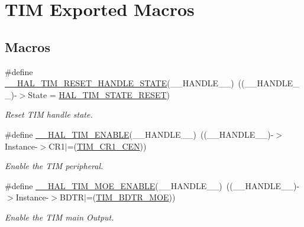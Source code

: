 \hypertarget{group___t_i_m___exported___macros}{}\section{T\+IM Exported Macros}
\label{group___t_i_m___exported___macros}
\subsection*{Macros}
\begin{DoxyCompactItemize}
\item 
\#define \hyperlink{group___t_i_m___exported___macros_gace20fd4e38231b9682fbc83a80ec19a3}{\+\_\+\+\_\+\+H\+A\+L\+\_\+\+T\+I\+M\+\_\+\+R\+E\+S\+E\+T\+\_\+\+H\+A\+N\+D\+L\+E\+\_\+\+S\+T\+A\+TE}(\+\_\+\+\_\+\+H\+A\+N\+D\+L\+E\+\_\+\+\_\+)~((\+\_\+\+\_\+\+H\+A\+N\+D\+L\+E\+\_\+\+\_\+)-\/$>$State = \hyperlink{group___t_i_m___exported___types_ggae0994cf5970e56ca4903e9151f40010ca28011b79e60b74a6c55947c505c51cbc}{H\+A\+L\+\_\+\+T\+I\+M\+\_\+\+S\+T\+A\+T\+E\+\_\+\+R\+E\+S\+ET})
\begin{DoxyCompactList}\small\item\em Reset T\+IM handle state. \end{DoxyCompactList}\item 
\#define \hyperlink{group___t_i_m___exported___macros_ga1a90544705059e9f19f991651623b0c0}{\+\_\+\+\_\+\+H\+A\+L\+\_\+\+T\+I\+M\+\_\+\+E\+N\+A\+B\+LE}(\+\_\+\+\_\+\+H\+A\+N\+D\+L\+E\+\_\+\+\_\+)~((\+\_\+\+\_\+\+H\+A\+N\+D\+L\+E\+\_\+\+\_\+)-\/$>$Instance-\/$>$C\+R1$\vert$=(\hyperlink{group___peripheral___registers___bits___definition_ga93d86355e5e3b399ed45e1ca83abed2a}{T\+I\+M\+\_\+\+C\+R1\+\_\+\+C\+EN}))
\begin{DoxyCompactList}\small\item\em Enable the T\+IM peripheral. \end{DoxyCompactList}\item 
\#define \hyperlink{group___t_i_m___exported___macros_ga04890dcef3ed061854721a3672585607}{\+\_\+\+\_\+\+H\+A\+L\+\_\+\+T\+I\+M\+\_\+\+M\+O\+E\+\_\+\+E\+N\+A\+B\+LE}(\+\_\+\+\_\+\+H\+A\+N\+D\+L\+E\+\_\+\+\_\+)~((\+\_\+\+\_\+\+H\+A\+N\+D\+L\+E\+\_\+\+\_\+)-\/$>$Instance-\/$>$B\+D\+TR$\vert$=(\hyperlink{group___peripheral___registers___bits___definition_ga277a096614829feba2d0a4fbb7d3dffc}{T\+I\+M\+\_\+\+B\+D\+T\+R\+\_\+\+M\+OE}))
\begin{DoxyCompactList}\small\item\em Enable the T\+IM main Output. \end{DoxyCompactList}\item 

\end{DoxyCompactItemize}
